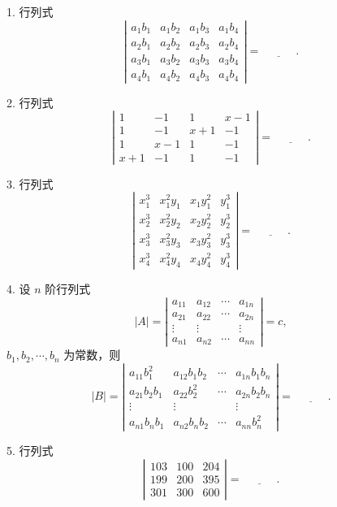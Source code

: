 \documentclass[UTF8,12pt,a4paper,fontset=fandol]{ctexart}
\begin{document}
1. 行列式
\[
\left|\begin{array}{cccc}
a_1b_1&a_1b_2&a_1b_3&a_1b_4\\
a_2b_1&a_2b_2&a_2b_3&a_2b_4\\
a_3b_1&a_3b_2&a_3b_3&a_3b_4\\
a_4b_1&a_4b_2&a_4b_3&a_4b_4
\end{array}\right|=\underline{\hspace{3em}}.
\]

2. 行列式
\[
\left|\begin{array}{cccc}
1&-1&1&x-1\\
1&-1&x+1&-1\\
1&x-1&1&-1\\
x+1&-1&1&-1
\end{array}\right|=\underline{\hspace{3em}}.
\]

3. 行列式
\[
\left|\begin{array}{cccc}
x_1^3&x_1^2y_1&x_1y_1^2&y_1^3\\
x_2^3&x_2^2y_2&x_2y_2^2&y_2^3\\
x_3^3&x_3^2y_3&x_3y_3^2&y_3^3\\
x_4^3&x_4^2y_4&x_4y_4^2&y_4^3
\end{array}\right|=\underline{\hspace{3em}}.
\]

4. 设 $n$ 阶行列式
\[
|A|=\left|\begin{array}{cccc}
a_{11}&a_{12}&\cdots&a_{1n}\\
a_{21}&a_{22}&\cdots&a_{2n}\\
\vdots&\vdots&&\vdots\\
a_{n1}&a_{n2}&\cdots&a_{nn}
\end{array}\right|=c,
\]
$b_1,b_2,\cdots,b_n$ 为常数，则
\[
|B|=\left|\begin{array}{cccc}
a_{11}b_1^2&a_{12}b_1b_2&\cdots&a_{1n}b_1b_n\\
a_{21}b_2b_1&a_{22}b_2^2&\cdots&a_{2n}b_2b_n\\
\vdots&\vdots&&\vdots\\
a_{n1}b_nb_1&a_{n2}b_nb_2&\cdots&a_{nn}b_n^2
\end{array}\right|=\underline{\hspace{3em}}.
\]

5. 行列式
\[
\left|\begin{array}{ccc}
103&100&204\\
199&200&395\\
301&300&600
\end{array}\right|=\underline{\hspace{3em}}.
\]
\end{document}
